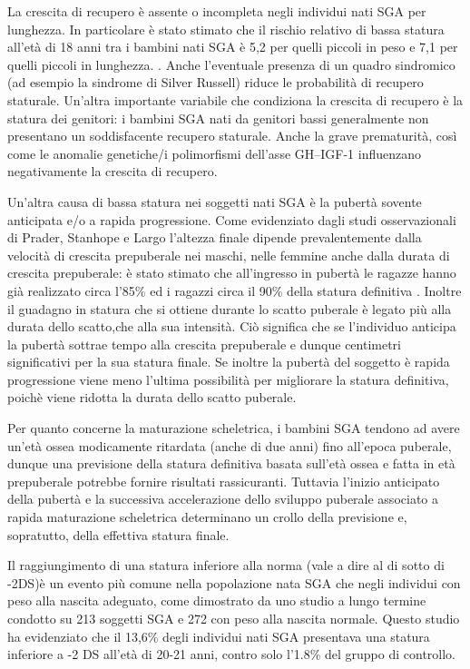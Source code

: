 La crescita di recupero è assente o incompleta negli individui nati SGA per lunghezza. In particolare è stato stimato che il rischio relativo di bassa statura all'età di 18 anni tra i bambini nati SGA è 5,2 per quelli 
piccoli in peso e 7,1 per quelli piccoli in lunghezza. \cite{cianfarani2006hormonal}. Anche l'eventuale presenza di un quadro sindromico (ad esempio la sindrome di Silver Russell) riduce le probabilità di recupero staturale. Un'altra importante variabile che condiziona la crescita di recupero è la statura dei genitori: i bambini SGA nati da genitori bassi generalmente non presentano un soddisfacente recupero staturale. Anche la grave prematurità, così come le anomalie genetiche/i polimorfismi dell'asse GH--IGF-1 influenzano negativamente la crescita di recupero. 


Un'altra causa di bassa statura nei soggetti nati SGA è la pubertà sovente anticipata e/o a rapida progressione\cite{albertsson2000children}.
Come evidenziato dagli studi osservazionali di Prader\cite{gasser1985human}, Stanhope\cite{stanhope1988new}
e Largo \cite{gasser2001growth} 
 l'altezza finale dipende prevalentemente dalla velocità di crescita prepuberale nei maschi, nelle femmine anche dalla durata di crescita prepuberale: è stato stimato che all'ingresso in pubertà le ragazze hanno già realizzato circa l'85\% ed i ragazzi circa il 90\% della statura definitiva . Inoltre il guadagno in statura che si ottiene durante lo scatto puberale è legato più alla durata dello scatto,che alla sua intensità. Ciò significa che se l'individuo anticipa la pubertà sottrae tempo alla crescita prepuberale e dunque centimetri significativi per la sua statura finale. Se inoltre la pubertà del soggetto è rapida progressione viene meno l'ultima possibilità per migliorare la statura definitiva, poichè viene ridotta la durata dello scatto puberale.
 

Per quanto concerne la maturazione scheletrica, i bambini SGA tendono ad avere un'età ossea modicamente ritardata (anche di due anni) fino all'epoca puberale, dunque una previsione della statura definitiva basata sull'età ossea e fatta in età prepuberale potrebbe fornire risultati rassicuranti. Tuttavia l'inizio anticipato della pubertà e la successiva accelerazione dello sviluppo puberale associato a rapida maturazione scheletrica determinano un crollo della previsione e, sopratutto, della effettiva statura finale\cite{job1986histoire}.

Il raggiungimento di una statura inferiore alla norma (vale a dire al di sotto di -2DS)è un evento più comune nella popolazione nata SGA che negli individui con peso alla nascita adeguato, come dimostrato da uno studio a lungo termine condotto su 213 soggetti SGA e 272 con peso alla nascita normale. Questo studio ha evidenziato che il 
13,6\% degli individui nati SGA presentava una statura inferiore a -2 DS all'età di
20-21 anni, contro solo l'1.8\% del gruppo di controllo.\cite{leger1997reduced}

